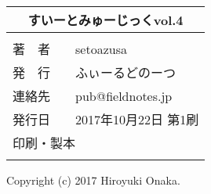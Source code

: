 \newpage
\pagestyle{fancy}
\lhead[]{}
\chead[]{}
\rhead[]{}


\begin{center}
    \vspace*{95mm} %

\begin{tabular}{l}
\multicolumn{1}{c}{\Large{すいーとみゅーじっくvol.4}}\\[3mm] %
\hline
\\[-3mm]
\hspace{2mm}\large{著　者　　}\hspace{5mm}setoazusa\\[0mm] 
\hspace{2mm}\large{発　行　　}\hspace{5mm}ふぃーるどのーつ\\[0mm] 
\hspace{2mm}\large{連絡先　　}\hspace{5mm}pub@fieldnotes.jp\\[0mm] 
\hspace{2mm}\large{発行日　　}\hspace{5mm}2017年10月22日 第1刷\\[0mm]
\hspace{2mm}\large{印刷・製本}\hspace{5mm}{日光企画}\\[0mm]
\\\hline
\end{tabular}
\end{center}
\begin{center}
Copyright (c) 2017 Hiroyuki Onaka.
\end{center}


